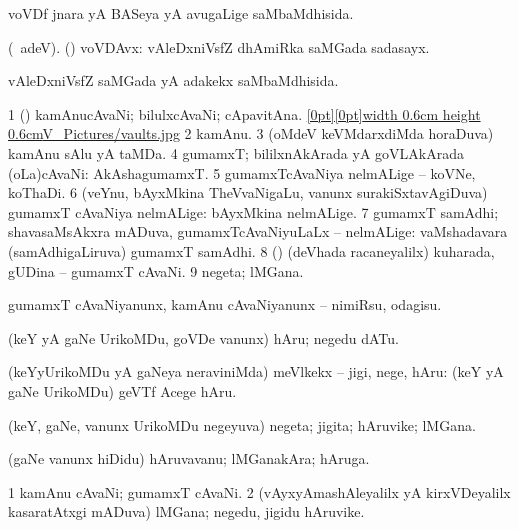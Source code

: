 \bentry
{} 
\gl{\gu}
\expl{}
\bmng
 voVDf jnara yA BASeya yA avugaLige saMbaMdhisida. 
\emng
\eentry

\bentry
{} 
\gl{\nA}
\bmng
(\bava\ adeV). (\ca) voVDAvx: vAleDxniVsfZ dhAmiRka saMGada sadasayx. 
\emng
\eentry

\bentry
{} 
\gl{\gu}
\expl{}
\bmng
 vAleDxniVsfZ saMGada yA adakekx saMbaMdhisida. 
\emng
\eentry

\bentry
{} 
\gl{\nA}
\bmng
\bnum
\num{1} (\vAshi) kamAnucAvaNi; bilulxcAvaNi; cApavitAna. \quad \hyperlink{vaultsfigure}{\raisebox{-0.15cm}[0pt][0pt]{\pdfimage width 0.6cm height 0.6cm{V_Pictures/vaults.jpg}}} 
\num{2} kamAnu. 
\num{3} (oMdeV keVMdarxdiMda horaDuva) kamAnu sAlu yA taMDa. 
\num{4} gumamxT; bililxnAkArada yA goVLAkArada (oLa)cAvaNi:  AkAshagumamxT. 
\num{5} gumamxTcAvaNiya nelmALige -- koVNe, koThaDi. 
\num{6} (veYnu, bAyxMkina TheVvaNigaLu, \mo vanunx surakiSxtavAgiDuva) gumamxT cAvaNiya nelmALige:  bAyxMkina nelmALige. 
\num{7} gumamxT samAdhi; shavasaMsAkxra mADuva, gumamxTcAvaNiyuLaLx -- nelmALige:  vaMshadavara (samAdhigaLiruva) gumamxT samAdhi. 
\num{8} (\aMrashA) (deVhada racaneyalilx) kuharada, gUDina -- gumamxT cAvaNi. 
\num{9} negeta; lMGana. 
\enum
\emng
\eentry

\bentry
{} 
\gl{\sakirx}
\expl{}
\bmng
 gumamxT cAvaNiyanunx, kamAnu cAvaNiyanunx -- nimiRsu, odagisu. 
\emng
\eentry

\bentry
{} 
\gl{\sakirx}
\expl{}
\bmng
 (keY yA gaNe UrikoMDu, goVDe \mo vanunx) hAru; negedu dATu. 
\emng

\noindent 
\gl{\akirx}
\expl{}
\bmng
(keYyUrikoMDu yA gaNeya neraviniMda) meVlkekx -- jigi, nege, hAru:  (keY yA gaNe UrikoMDu) geVTf Acege hAru. 
\emng
\eentry

\bentry
{} 
\gl{\nA}
\expl{}
\bmng
 (keY, gaNe, \mo vanunx UrikoMDu negeyuva) negeta; jigita; hAruvike; lMGana. 
\emng
\eentry

\bentry
{} 
\gl{\nA}
\expl{}
\bmng
 (gaNe \mo vanunx hiDidu) hAruvavanu; lMGanakAra; hAruga. 
\emng
\eentry

\bentry
{} 
\gl{\nA}
\expl{}
\bmng
\bnum
\num{1} kamAnu cAvaNi; gumamxT cAvaNi. 
\num{2} (vAyxyAmashAleyalilx yA kirxVDeyalilx kasaratAtxgi mADuva) lMGana; negedu, jigidu hAruvike. 
\enum
\emng
\eentry

